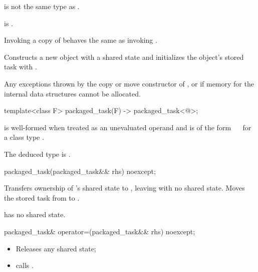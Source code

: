 \begin{itemdescr}
\pnum
\constraints
{}
is not the same type as .

\pnum
\mandates
{} is .

\pnum
\expects
Invoking a copy of  behaves the same as invoking .

\pnum
\effects
Constructs a new  object with a shared state and
initializes the object's stored task with .

\pnum
\throws
Any exceptions thrown by the copy or move constructor of , or
 if memory for the internal data structures
cannot be allocated.
\end{itemdescr}

%
\begin{itemdecl}
template<class F> packaged_task(F) -> packaged_task<@\seebelow@>;
\end{itemdecl}

\begin{itemdescr}
\pnum
\constraints
{} is well-formed when
treated as an unevaluated operand and
 is of the form
~\cv{}~
for a class type .

\pnum
\remarks
The deduced type is .
\end{itemdescr}

%
\begin{itemdecl}
packaged_task(packaged_task&& rhs) noexcept;
\end{itemdecl}

\begin{itemdescr}
\pnum
\effects
Transfers ownership of
's shared state to , leaving  with no
shared state. Moves the stored task from  to .

\pnum
\ensures
{} has no shared state.
\end{itemdescr}

%
\begin{itemdecl}
packaged_task& operator=(packaged_task&& rhs) noexcept;
\end{itemdecl}

\begin{itemdescr}
\pnum
\effects
\begin{itemize}
\item
Releases any shared state;
\item
calls .
\end{itemize}
\end{itemdescr}

